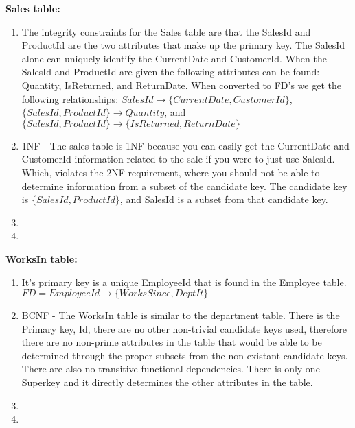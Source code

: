 \documentclass{article}
\begin{document}
  \par\textbf{Sales table:}
  \begin{enumerate}[label=\roman*]
  	\item The integrity constraints for the Sales table are that the SalesId and ProductId are the two attributes that make up the primary key. The SalesId alone can uniquely identify the CurrentDate and CustomerId. When the SalesId and ProductId are given
    the following attributes can be found: Quantity, IsReturned, and ReturnDate. When converted to FD's we get the following
    relationships: $SalesId\rightarrow\{CurrentDate,CustomerId\}$, $\{SalesId,ProductId\}\rightarrow Quantity$, and 
    $\{SalesId,ProductId\}\rightarrow\{IsReturned,ReturnDate\}$
  	\item 1NF - The sales table is 1NF because you can easily get the CurrentDate and CustomerId information related to the sale if you were to just use SalesId. Which, violates the 2NF requirement, where you should not be able to determine information from a subset of the candidate key. The candidate key is $\{SalesId,ProductId\}$, and SalesId is a subset from that candidate key.
  	\item
  	\item
  \end{enumerate}
  \par\textbf{WorksIn table:}
  \begin{enumerate}[label=\roman*]
  	\item It's primary key is a unique EmployeeId that is found in the Employee table. \newline
    $FD = EmployeeId \rightarrow \{WorksSince, DeptIt\}$
  	\item BCNF - The WorksIn table is similar to the department table. There is the Primary key, Id, there are no other non-trivial candidate keys used, therefore there are no non-prime attributes in the table that would be able to be determined through the proper subsets from the non-existant candidate keys. There are also no transitive functional dependencies. There is only one Superkey and it directly determines the other attributes in the table.
  	\item
  	\item
  \end{enumerate}
\end{document}
